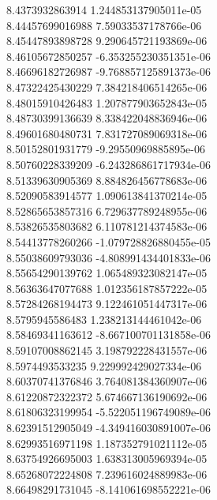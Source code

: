 {8.4373932863914 1.244853137905011e-05
 \\
8.44457699016988 7.59033537178766e-06
 \\
8.45447893898728 9.290645721193869e-06
 \\
8.46105672850257 -6.353255230351351e-06
 \\
8.46696182726987 -9.768857125891373e-06
 \\
8.47322425430229 7.384218406514265e-06
 \\
8.48015910426483 1.207877903652843e-05
 \\
8.48730399136639 8.338422048836946e-06
 \\
8.49601680480731 7.831727089069318e-06
 \\
8.50152801931779 -9.29550969885895e-06
 \\
8.50760228339209 -6.243286861717934e-06
 \\
8.51339630905369 8.884826456778683e-06
 \\
8.52090583914577 1.090613841370214e-05
 \\
8.52865653857316 6.729637789248955e-06
 \\
8.53826535803682 6.110781214374583e-06
 \\
8.54413778260266 -1.079728826880455e-05
 \\
8.55038609793036 -4.808991434401833e-06
 \\
8.55654290139762 1.065489323082147e-05
 \\
8.56363647077688 1.012356187857222e-05
 \\
8.57284268194473 9.122461051447317e-06
 \\
8.5795945586483 1.238213144461042e-06
 \\
8.58469341163612 -8.667100701131858e-06
 \\
8.59107008862145 3.198792228431557e-06
 \\
8.5974493533235 9.229992429027334e-06
 \\
8.60370741376846 3.764081384360907e-06
 \\
8.61220872322372 5.674667136190692e-06
 \\
8.61806323199954 -5.522051196749089e-06
 \\
8.62391512905049 -4.349416030891007e-06
 \\
8.62993516971198 1.187352791021112e-05
 \\
8.63754926695003 1.638313005969394e-05
 \\
8.65268072224808 7.239616024889983e-06
 \\
8.66498291731045 -8.141061698552221e-06
}

